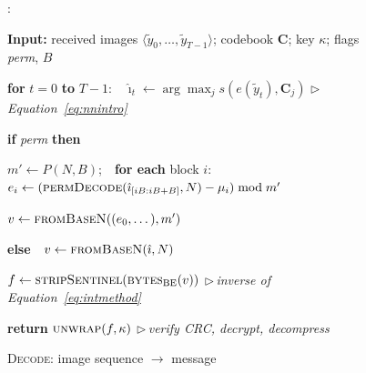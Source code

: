 \documentclass[10pt,a4paper]{article}
\theoremstyle{definition}
\newcounter{algln}
\begin{document}
\begin{figure}[t]\captionsetup{type=algorithm}
\caption{\textsc{Decode}: image sequence $\to$ message}\label{alg:decode}
\begin{list}{\footnotesize{}:}{%
    \setlength{\leftmargin}{2.4em}\setlength{\labelwidth}{1.7em}%
    \setlength{\labelsep}{0.4em}\setlength{\itemsep}{1.5pt}%
    \setlength{\parsep}{0pt}\setlength{\topsep}{3pt}\small}
\item \textbf{Input:} received images $\langle\tilde y_0,\dots,\tilde y_{T-1}\rangle$;
      codebook $\mathbf{C}$; key $\kappa$; flags \textit{perm}, $B$
\item \textbf{for} $t=0$ \textbf{to} $T-1$:\ \ $\hat\imath_t\gets\arg\max_j s(e(\tilde y_t),\mathbf{C}_j)$ \hfill{\footnotesize$\triangleright$\,\textit{Equation~\eqref{eq:nnintro}}}
\item \textbf{if} \textit{perm} \textbf{then}
\item \hspace*{1.3em} $m'\gets P(N,B)$;\ \ \textbf{for each} block $i$:\ \ $e_i\gets(\textsc{permDecode}(\hat\imath_{[iB:iB+B]},N)-\mu_i)\bmod m'$
\item \hspace*{1.3em} $v\gets\textsc{fromBaseN}((e_0,\dots),m')$
\item \textbf{else}\ \ $v\gets\textsc{fromBaseN}(\hat\imath,N)$
\item $f\gets\textsc{stripSentinel}(\textsc{bytes}_{\mathrm{BE}}(v))$ \hfill{\footnotesize$\triangleright$\,\textit{inverse of Equation~\eqref{eq:intmethod}}}
\item \textbf{return} $\textsc{unwrap}(f,\kappa)$ \hfill{\footnotesize$\triangleright$\,\textit{verify CRC, decrypt, decompress}}
\end{list}
\end{figure}

\end{document}
